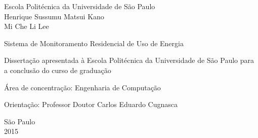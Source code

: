 \begin{titlepage}

\begin{center}
\large
Escola Politécnica da Universidade de São Paulo\\
Henrique Sussumu Matsui Kano\\
Mi Che Li Lee

\vspace{90mm}
\Large
Sistema de Monitoramento Residencial de Uso de Energia
\end{center}

\vspace{20mm}
\large
\hspace{60mm}\begin{minipage}{18em}
	Dissertação apresentada à Escola Politécnica da Universidade de São Paulo para a conclusão do curso de graduação
\end{minipage}

\large
\hspace{60mm}\begin{minipage}{18em}
Área de concentração: Engenharia de Computação
\end{minipage}

\large
\hspace{60mm}\begin{minipage}{18em}
Orientação: Professor Doutor Carlos Eduardo Cugnasca
\end{minipage}

\begin{center}
\vfill
São Paulo\\
2015

\end{center}

\end{titlepage}
